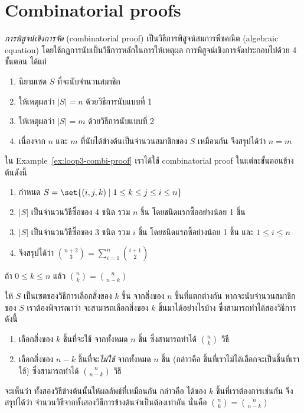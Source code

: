 \section{Combinatorial proofs}
\emph{การพิสูจน์เชิงการจัด} (combinatorial proof) เป็นวิธีการพิสูจน์สมการพีชคณิต (algebraic equation) โดยใช้กฎการนับเป็นวิธีการหลักในการให้เหตุผล \enskip การพิสูจน์เชิงการจัดประกอบไปด้วย 4 ขั้นตอน ได้แก่
\begin{enumerate}[]
\item นิยามเซต $S$ ที่จะนับจำนวนสมาชิก
\item ให้เหตุผลว่า $|S|=n$ ด้วยวิธีการนับแบบที่ 1
\item ให้เหตุผลว่า $|S|=m$ ด้วยวิธีการนับแบบที่ 2
\item เนื่องจาก $n$ และ $m$ ที่นับได้ข้างต้นเป็นจำนวนสมาชิกของ $S$ เหมือนกัน จึงสรุปได้ว่า $n=m$
\end{enumerate}

\begin{example}
ใน Example~\ref{ex:loop3-combi-proof} เราได้ใช้ combinatorial proof ในแต่ละขั้นตอนข้างต้นดังนี้
\begin{enumerate}[]
\item กำหนด $S=\set{(i,j,k)\mid 1\leq k\leq j\leq i\leq n}$
\item $|S|$ เป็นจำนวนวิธีซื้อของ 4 ชนิด รวม $n$ ชิ้น โดยชนิดแรกซื้ออย่างน้อย 1 ชิ้น
\item $|S|$ เป็นจำนวนวิธีซื้อของ 3 ชนิด รวม $i$ ชิ้น โดยชนิดแรกซื้อย่างน้อย 1 ชิ้น และ $1\leq i\leq n$
\item จึงสรุปได้ว่า $\binom{n+2}{3}=\sum_{i=1}^{n}{\binom{i+1}{2}}$
\end{enumerate}
\end{example}

\begin{example}
ถ้า $0\leq k\leq n$ แล้ว $\binom{n}{k}=\binom{n}{n-k}$
\begin{pf}
ให้ $S$ เป็นเซตของวิธีการเลือกสิ่งของ $k$ ชิ้น จากสิ่งของ $n$ ชิ้นที่แตกต่างกัน \enskip หากจะนับจำนวนสมาชิกของ $S$ เราต้องพิจารณาว่า จะสามารถเลือกสิ่งของ $k$ ชิ้นมาได้อย่างไรบ้าง ซึ่งสามารถทำได้สองวิธีการ ดังนี้
\begin{enumerate}[]
\item เลือกสิ่งของ $k$ ชิ้นที่จะใช้ จากทั้งหมด $n$ ชิ้น ซึ่งสามารถทำได้ $\binom{n}{k}$ วิธี
\item เลือกสิ่งของ $n-k$ ชิ้นที่จะ\emph{ไม่ใช้} จากทั้งหมด $n$ ชิ้น (กล่าวคือ ชิ้นที่เราไม่ได้เลือกจะเป็นชิ้นที่เราใช้) ซึ่งสามารถทำได้ $\binom{n}{n-k}$ วิธี
\end{enumerate}
จะเห็นว่า ทั้งสองวิธีข้างต้นนั้นให้ผลลัพธ์ที่เหมือนกัน กล่าวคือ ได้ของ $k$ ชิ้นที่เราต้องการเช่นกัน จึงสรุปได้ว่า จำนวนวิธีจากทั้งสองวิธีการข้างต้นจำเป็นต้องเท่ากัน นั่นคือ $\binom{n}{k}=\binom{n}{n-k}$
\end{pf}
\end{example}

